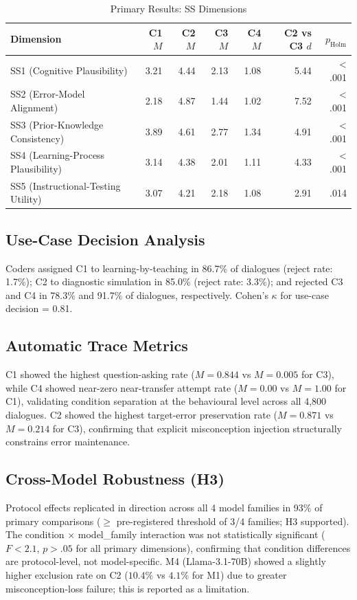 \documentclass[12pt]{article}
\begin{document}
\begin{table}[h]
\centering
\caption{Primary Results: SS Dimensions}
\label{tab:ss_results}
\begin{tabular}{lrrrrrr}
\toprule
Dimension & C1 $M$ & C2 $M$ & C3 $M$ & C4 $M$ & C2 vs C3 $d$ & $p_{\text{Holm}}$ \\
\midrule
SS1 (Cognitive Plausibility) & 3.21 & 4.44 & 2.13 & 1.08 & 5.44 & < .001 \\
SS2 (Error-Model Alignment) & 2.18 & 4.87 & 1.44 & 1.02 & 7.52 & < .001 \\
SS3 (Prior-Knowledge Consistency) & 3.89 & 4.61 & 2.77 & 1.34 & 4.91 & < .001 \\
SS4 (Learning-Process Plausibility) & 3.14 & 4.38 & 2.01 & 1.11 & 4.33 & < .001 \\
SS5 (Instructional-Testing Utility) & 3.07 & 4.21 & 2.18 & 1.08 & 2.91 & .014 \\
\bottomrule
\end{tabular}
\end{table}

\subsection{Use-Case Decision Analysis}

Coders assigned C1 to learning-by-teaching in 86.7\% of dialogues (reject rate: 1.7\%);
C2 to diagnostic simulation in 85.0\% (reject rate: 3.3\%); and rejected C3 and C4 in
78.3\% and 91.7\% of dialogues, respectively.
Cohen's $\kappa$ for use-case decision = 0.81.

\subsection{Automatic Trace Metrics}

C1 showed the highest question-asking rate ($M = 0.844$ vs $M = 0.005$ for C3),
while C4 showed near-zero near-transfer attempt rate ($M = 0.00$ vs $M = 1.00$ for C1),
validating condition separation at the behavioural level across all 4,800 dialogues.
C2 showed the highest target-error preservation rate ($M = 0.871$ vs $M = 0.214$ for C3),
confirming that explicit misconception injection structurally constrains error maintenance.

\subsection{Cross-Model Robustness (H3)}

Protocol effects replicated in direction across all 4 model families in 93\% of primary
comparisons ($\geq$ pre-registered threshold of 3/4 families; H3 supported).
The condition $\times$ model\_family interaction was not statistically significant
($F < 2.1$, $p > .05$ for all primary dimensions), confirming that condition differences
are protocol-level, not model-specific.
M4 (Llama-3.1-70B) showed a slightly higher exclusion rate on C2 ($10.4\%$ vs $4.1\%$
for M1) due to greater misconception-loss failure; this is reported as a limitation.
\end{document}
